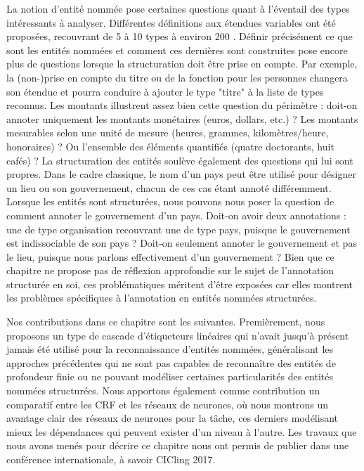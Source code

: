 \documentclass[12pt,a4paper,times,twoside,openright]{report}
\begin{document}
La notion d'entité nommée pose certaines questions quant à l'éventail des types intéressants à analyser. Différentes définitions aux étendues variables ont été proposées, recouvrant de 5 à 10 types \citep{grishman1996message,tjong2003introduction,sagot2012annotation} à environ 200 \citep{sekine2002extended}. Définir précisément ce que sont les entités nommées et comment ces dernières sont construites pose encore plus de questions lorsque la structuration doit être prise en compte. Par exemple, la (non-)prise en compte du titre ou de la fonction pour les personnes changera son étendue et pourra conduire à ajouter le type "titre" à la liste de types reconnus. Les montants illustrent assez bien cette question du périmètre : doit-on annoter uniquement les montants monétaires (euros, dollars, etc.) ? Les montants mesurables selon une unité de mesure (heures, grammes, kilomètres/heure, honoraires) ? Ou l'ensemble des éléments quantifiés (quatre doctorants, huit cafés) ? La structuration des entités soulève également des questions qui lui sont propres. Dans le cadre classique, le nom d'un pays peut être utilisé pour désigner un lieu ou son gouvernement, chacun de ces cas étant annoté différemment. Lorsque les entités sont structurées, nous pouvons nous poser la question de comment annoter le gouvernement d'un pays. Doit-on avoir deux annotations : une de type organisation recouvrant une de type pays, puisque le gouvernement est indissociable de son pays ? Doit-on seulement annoter le gouvernement et pas le lieu, puisque nous parlons effectivement d'un gouvernement ? Bien que ce chapitre ne propose pas de réflexion approfondie sur le sujet de l'annotation structurée en soi, ces problématiques méritent d'être exposées car elles montrent les problèmes spécifiques à l'annotation en entités nommées structurées.

Nos contributions dans ce chapitre sont les suivantes. Premièrement, nous proposons un type de cascade d'étiqueteurs linéaires qui n'avait jusqu'à présent jamais été utilisé pour la reconnaissance d'entités nommées, généralisant les approches précédentes qui ne sont pas capables de reconnaître des entités de profondeur finie ou ne pouvant modéliser certaines particularités des entités nommées structurées. Nous apportons également comme contribution un comparatif entre les CRF et les réseaux de neurones, où nous montrons un avantage clair des réseaux de neurones pour la tâche, ces derniers modélisant mieux les dépendances qui peuvent exister d'un niveau à l'autre. Les travaux que nous avons menés pour décrire ce chapitre nous ont permis de publier dans une conférence internationale, à savoir CICling 2017.
\end{document}
